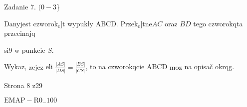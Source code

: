 \documentclass[a4paper,12pt]{article}
\begin{document}
Zadanie 7. $(0-3$\}

Danyjest $\mathrm{c}\mathrm{z}\mathrm{w}\mathrm{o}\mathrm{r}\mathrm{o}\mathrm{k}_{\mathrm{c}}$]$\mathrm{t}$ wypukly ABCD. $\mathrm{P}\mathrm{r}\mathrm{z}\mathrm{e}\mathrm{k}_{\mathrm{c}}$]$\mathrm{t}\mathrm{n}\mathrm{e} AC$ oraz $BD$ tego czworokqta przecinajq

si9 w punkcie $S.$

Wykaz, $\dot{\mathrm{z}}\mathrm{e}\mathrm{j}\mathrm{e}\dot{\mathrm{z}}$ eli $\displaystyle \frac{|AS|}{|DS|}=\frac{|BS|}{|CS|}$, to na czworokqcie ABCD $\mathrm{m}\mathrm{o}\dot{\mathrm{z}}$ na opisač okrqg.

Strona 8 z29

$\mathrm{E}\mathrm{M}\mathrm{A}\mathrm{P}-\mathrm{R}0_{-}100$
\end{document}
